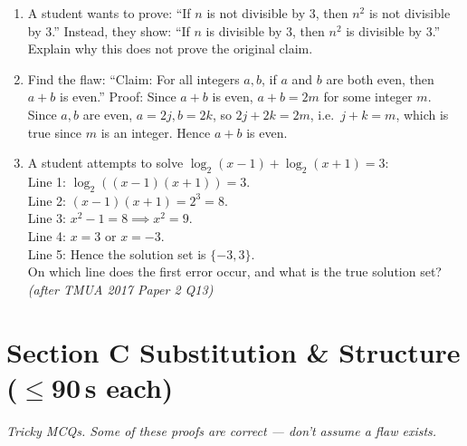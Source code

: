 \documentclass[11pt,a4paper]{article}
\begin{document}
\begin{enumerate}
\item A student wants to prove: ``If $n$ is not divisible by $3$, then $n^2$ is not divisible by $3$.'' Instead, they show: ``If $n$ is divisible by $3$, then $n^2$ is divisible by $3$.'' Explain why this does not prove the original claim.

\item Find the flaw: ``Claim: For all integers $a,b$, if $a$ and $b$ are both even, then $a+b$ is even.'' Proof: Since $a+b$ is even, $a+b=2m$ for some integer $m$. Since $a,b$ are even, $a=2j,b=2k$, so $2j+2k=2m$, i.e.\ $j+k=m$, which is true since $m$ is an integer. Hence $a+b$ is even.

\item A student attempts to solve $\log_2(x-1) + \log_2(x+1) = 3$:\\
Line 1: $\log_2((x-1)(x+1)) = 3$.\\
Line 2: $(x-1)(x+1) = 2^3 = 8$.\\
Line 3: $x^2 - 1 = 8 \implies x^2 = 9$.\\
Line 4: $x = 3$ or $x = -3$.\\
Line 5: Hence the solution set is $\{-3, 3\}$.\\
On which line does the first error occur, and what is the true solution set? \textit{\small(after TMUA 2017 Paper 2 Q13)}

\end{enumerate}

\section*{Section C \quad Substitution \& Structure \hfill{\normalfont\small($\leq$90\,s each)}}

\noindent\textit{Tricky MCQs. Some of these proofs are correct --- don't assume a flaw exists.}
\end{document}
